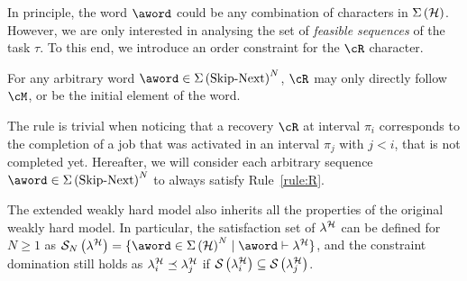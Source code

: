 In principle, the word $\aword$ could be any combination of characters in $\Sigma\left(\mathcal{H}\right)$.
However, we are only interested in analysing the set of \emph{feasible sequences} of the task $\tau$.
To this end, we introduce an order constraint for the $\cR$ character.
%
\begin{rule_}%
    \label{rule:R}%
    For any arbitrary word $\aword \in \Sigma\left(\text{Skip-Next}\right)^N$, $\cR$ may only directly follow $\cM$, or be the initial element of the word.
\end{rule_}
%
The rule is trivial when noticing that a recovery $\cR$ at interval $\pi_i$ corresponds to the completion of a job that was activated in an interval $\pi_j$ with $j<i$, that is not completed yet.
Hereafter, we will consider each arbitrary sequence $\aword\in \Sigma\left(\text{Skip-Next}\right)^N$ to always satisfy Rule~\ref{rule:R}.

The extended weakly hard model also inherits all the properties of the original weakly hard model.
In particular, the satisfaction set of $\lambda^{\mathcal{H}}$ can be defined for $N\geq 1$ as $\sset{N}{\lambda^{\strat}} = \{ \aword \in \Sigma\left(\strat\right)^N \mid \aword \vdash \lambda^{\strat} \}$, and the constraint domination still holds as $\lambda^{\mathcal{H}}_{i} \preceq \lambda^{\mathcal{H}}_{j}$ if $\mathcal{S}_{}\left( \lambda^{\mathcal{H}}_{i}  \right) \subseteq \mathcal{S}_{}\left( \lambda^{\mathcal{H}}_{j} \right)$.

